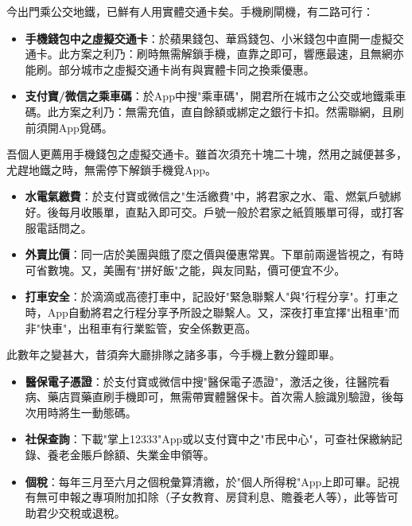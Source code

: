 
今出門乘公交地鐵，已鮮有人用實體交通卡矣。手機刷閘機，有二路可行：

\begin{itemize}
  \item \textbf{手機錢包中之虛擬交通卡}：於蘋果錢包、華爲錢包、小米錢包中直開一虛擬交通卡。此方案之利乃：刷時無需解鎖手機，直靠之即可，響應最速，且無網亦能刷。部分城市之虛擬交通卡尚有與實體卡同之換乘優惠。
  \item \textbf{支付寶/微信之乘車碼}：於App中搜"乘車碼"，開君所在城市之公交或地鐵乘車碼。此方案之利乃：無需充值，直自餘額或綁定之銀行卡扣。然需聯網，且刷前須開App覓碼。
\end{itemize}

吾個人更薦用手機錢包之虛擬交通卡。雖首次須充十塊二十塊，然用之誠便甚多，尤趕地鐵之時，無需停下解鎖手機覓App。


\begin{itemize}
  \item \textbf{水電氣繳費}：於支付寶或微信之"生活繳費"中，將君家之水、電、燃氣戶號綁好。後每月收賬單，直點入即可交。戶號一般於君家之紙質賬單可得，或打客服電話問之。
  \item \textbf{外賣比價}：同一店於美團與餓了麼之價與優惠常異。下單前兩邊皆視之，有時可省數塊。又，美團有"拼好飯"之能，與友同點，價可便宜不少。
  \item \textbf{打車安全}：於滴滴或高德打車中，記設好"緊急聯繫人"與"行程分享"。打車之時，App自動將君之行程分享予所設之聯繫人。又，深夜打車宜擇"出租車"而非"快車"，出租車有行業監管，安全係數更高。
\end{itemize}


此數年之變甚大，昔須奔大廳排隊之諸多事，今手機上數分鐘即畢。

\begin{itemize}
  \item \textbf{醫保電子憑證}：於支付寶或微信中搜"醫保電子憑證"，激活之後，往醫院看病、藥店買藥直刷手機即可，無需帶實體醫保卡。首次需人臉識別驗證，後每次用時將生一動態碼。
  \item \textbf{社保查詢}：下載"掌上12333"App或以支付寶中之"市民中心"，可查社保繳納記錄、養老金賬戶餘額、失業金申領等。
  \item \textbf{個稅}：每年三月至六月之個稅彙算清繳，於"個人所得稅"App上即可畢。記視有無可申報之專項附加扣除（子女教育、房貸利息、贍養老人等），此等皆可助君少交稅或退稅。
\end{itemize}

